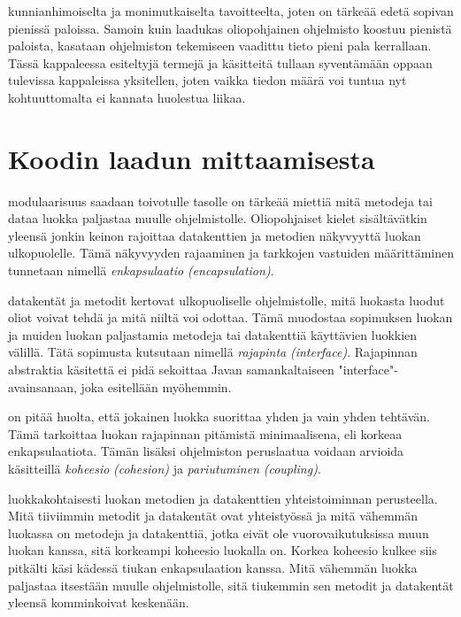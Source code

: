 \documentclass{tufte-book}
\newcommand{\eng}[1]{\textit{(#1)}}
\newcommand{\new}[1]{\textit{\gls{#1}}}
\newcommand{\neweng}[2]{\new{#1} \eng{#2}}
\begin{document}
 kunnianhimoiselta ja monimutkaiselta tavoitteelta, joten on tärkeää
edetä sopivan pienissä paloissa. Samoin kuin laadukas oliopohjainen ohjelmisto koostuu pienistä
paloista, kasataan ohjelmiston tekemiseen vaadittu tieto pieni pala kerrallaan. Tässä kappaleessa
esiteltyjä termejä ja käsitteitä tullaan syventämään oppaan tulevissa kappaleissa yksitellen,
joten vaikka tiedon määrä voi tuntua nyt kohtuuttomalta ei kannata huolestua liikaa.


\section{Koodin laadun mittaamisesta}

 modulaarisuus saadaan toivotulle tasolle on tärkeää miettiä mitä
metodeja tai dataa luokka paljastaa muulle ohjelmistolle. Oliopohjaiset kielet sisältävätkin
yleensä jonkin keinon rajoittaa datakenttien ja metodien näkyvyyttä luokan ulkopuolelle. Tämä
näkyvyyden rajaaminen ja tarkkojen vastuiden määrittäminen tunnetaan nimellä
\neweng{enkapsulaatio}{encapsulation}.

 datakentät ja metodit kertovat ulkopuoliselle ohjelmistolle, mitä
luokasta luodut oliot voivat tehdä ja mitä niiltä voi odottaa. Tämä muodostaa sopimuksen luokan ja
muiden luokan paljastamia metodeja tai datakenttiä käyttävien luokkien välillä. Tätä sopimusta
kutsutaan nimellä \neweng{rajapinta}{interface}. Rajapinnan abstraktia käsitettä ei pidä sekoittaa
Javan samankaltaiseen "interface"-avainsanaan, joka esitellään myöhemmin.

 on pitää huolta, että jokainen luokka
suorittaa yhden ja vain yhden tehtävän. Tämä tarkoittaa luokan rajapinnan pitämistä minimaalisena,
eli korkeaa enkapsulaatiota. Tämän lisäksi ohjelmiston peruslaatua voidaan arvioida käsitteillä
\neweng{koheesio}{cohesion} ja \neweng{pariutuminen}{coupling}.

 luokkakohtaisesti luokan metodien ja datakenttien
yhteistoiminnan perusteella. Mitä tiiviimmin metodit ja datakentät ovat yhteistyössä ja mitä
vähemmän luokassa on metodeja ja datakenttiä, jotka eivät ole vuorovaikutuksissa muun luokan
kanssa, sitä korkeampi koheesio luokalla on. Korkea koheesio kulkee siis pitkälti käsi kädessä
tiukan enkapsulaation kanssa. Mitä vähemmän luokka paljastaa itsestään muulle ohjelmistolle, sitä
tiukemmin sen metodit ja datakentät yleensä komminkoivat keskenään.
\end{document}
